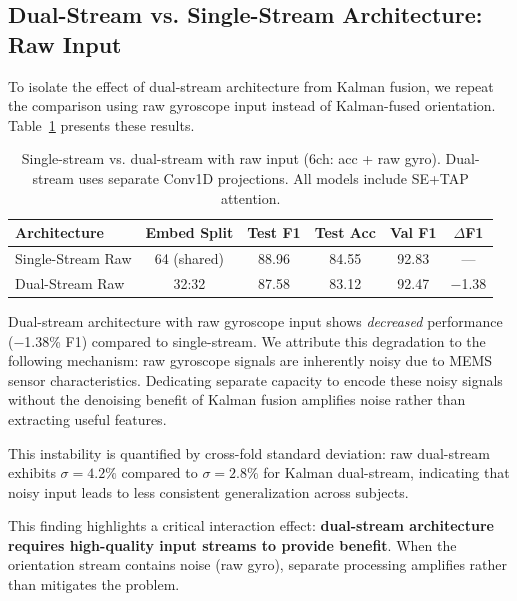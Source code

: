 \subsection{Dual-Stream vs. Single-Stream Architecture: Raw Input}
\label{subsec:stream_raw}

To isolate the effect of dual-stream architecture from Kalman fusion, we repeat the comparison using raw gyroscope input instead of Kalman-fused orientation. Table~\ref{tab:stream_raw} presents these results.

\begin{table}[H]
\caption{Single-stream vs. dual-stream with raw input (6ch: acc + raw gyro). Dual-stream uses separate Conv1D projections. All models include SE+TAP attention.}
\label{tab:stream_raw}
\centering
\begin{tabular}{lccccc}
\toprule
\textbf{Architecture} & \textbf{Embed Split} & \textbf{Test F1} & \textbf{Test Acc} & \textbf{Val F1} & \textbf{$\Delta$F1} \\
\midrule
Single-Stream Raw & 64 (shared) & 88.96 & 84.55 & 92.83 & --- \\
Dual-Stream Raw & 32:32 & 87.58 & 83.12 & 92.47 & $-$1.38 \\
\bottomrule
\end{tabular}
\end{table}

Dual-stream architecture with raw gyroscope input shows \textit{decreased} performance ($-$1.38\% F1) compared to single-stream. We attribute this degradation to the following mechanism: raw gyroscope signals are inherently noisy due to MEMS sensor characteristics. Dedicating separate capacity to encode these noisy signals without the denoising benefit of Kalman fusion amplifies noise rather than extracting useful features.

This instability is quantified by cross-fold standard deviation: raw dual-stream exhibits $\sigma = 4.2\%$ compared to $\sigma = 2.8\%$ for Kalman dual-stream, indicating that noisy input leads to less consistent generalization across subjects.

This finding highlights a critical interaction effect: \textbf{dual-stream architecture requires high-quality input streams to provide benefit}. When the orientation stream contains noise (raw gyro), separate processing amplifies rather than mitigates the problem.

